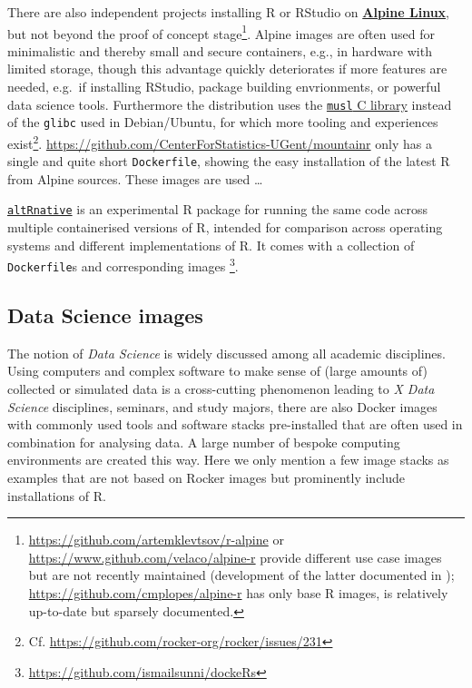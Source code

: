 There are also independent projects installing R or RStudio on
\href{https://www.alpinelinux.org/}{\textbf{Alpine Linux}}, but not
beyond the proof of concept
stage\footnote{\href{https://github.com/artemklevtsov/r-alpine}{https://github.com/artemklevtsov/r-alpine} or \href{https://www.github.com/velaco/alpine-r}{https://www.github.com/velaco/alpine-r} provide different use case images but are not recently maintained (development of the latter documented in \citet{ratesic_building_2018}); \href{https://github.com/cmplopes/alpine-r}{https://github.com/cmplopes/alpine-r} has only base R images, is relatively up-to-date but sparsely documented.}.
Alpine images are often used for minimalistic and thereby small and
secure containers, e.g., in hardware with limited storage, though this
advantage quickly deteriorates if more features are needed, e.g.~if
installing RStudio, package building envrionments, or powerful data
science tools. Furthermore the distribution uses the
\href{https://www.musl-libc.org/}{\texttt{musl} C library} instead of
the \texttt{glibc} used in Debian/Ubuntu, for which more tooling and
experiences
exist\footnote{Cf. \href{https://github.com/rocker-org/rocker/issues/231}{https://github.com/rocker-org/rocker/issues/231}}.
\href{https://github.com/CenterForStatistics-UGent/mountainr}{https://github.com/CenterForStatistics-UGent/mountainr}
only has a single and quite short \texttt{Dockerfile}, showing the easy
installation of the latest R from Alpine sources. These images are used
\ldots{}

\href{https://github.com/ismailsunni/altRnative/}{\texttt{altRnative}}
is an experimental R package for running the same code across multiple
containerised versions of R, intended for comparison across operating
systems and different implementations of R. It comes with a collection
of \texttt{Dockerfile}s and corresponding images
\footnote{\href{https://github.com/ismailsunni/dockeRs}{https://github.com/ismailsunni/dockeRs}}.

\hypertarget{data-science-images}{%
\subsection{Data Science images}\label{data-science-images}}

The notion of \emph{Data Science} is widely discussed among all academic
disciplines. Using computers and complex software to make sense of
(large amounts of) collected or simulated data is a cross-cutting
phenomenon leading to \emph{X Data Science} disciplines, seminars, and
study majors, there are also Docker images with commonly used tools and
software stacks pre-installed that are often used in combination for
analysing data. A large number of bespoke computing environments are
created this way. Here we only mention a few image stacks as examples
that are not based on Rocker images but prominently include
installations of R.

